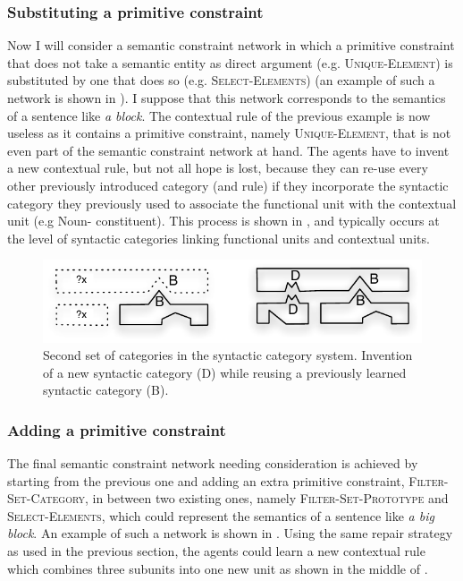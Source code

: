 \subsubsection{Substituting a primitive constraint}

Now I will consider a semantic constraint network in which a primitive
constraint that does not take a semantic entity as direct argument
(e.g. \textsc{Unique-Element}) is substituted by one that does so
(e.g. \textsc{Select-Ele\-ments}) (an example of such a network is shown
in ). I suppose that this network
corresponds to the semantics of a sentence like \textit{a block}. The
contextual rule of the previous example is now useless as it contains
a primitive constraint, namely \textsc{Unique-Element}, that is not
even part of the semantic constraint network at hand. The agents have
to invent a new contextual rule, but not all hope is lost, because
they can re-use every other previously introduced category (and rule)
if they incorporate the syntactic category they previously used to
associate the functional unit with the contextual unit (e.g Noun-
constituent). This process is shown in , and typically occurs at the level
of syntactic categories linking functional units and contextual units.

\begin{figure}[htbp]
  \begin{center}
    \includegraphics[width=.7\textwidth]{./composition/figures/mapping-2.pdf}
    \caption[Second set of categories in the syntactic category
    system]{Second set of categories in the syntactic category
      system. Invention of a new syntactic category (D) while reusing
      a previously learned syntactic category (B).}
    \label{f:map-syntactic-categories-2}
  \end{center}
\end{figure}

\subsubsection{Adding a primitive constraint}

The final semantic constraint network needing consideration is achieved by starting from the previous one and adding an extra
primitive constraint, \textsc{Filter-Set-Category}, in between two
existing ones, namely \textsc{Filter-Set-Prototype} and
\textsc{Select-Elements}, which could represent the semantics of a
sentence like \textit{a big block}. An example of such a network is shown
in . Using the same repair strategy as
used in the previous section, the agents could learn a new contextual
rule which combines three subunits into one new unit as shown in the
middle of .

